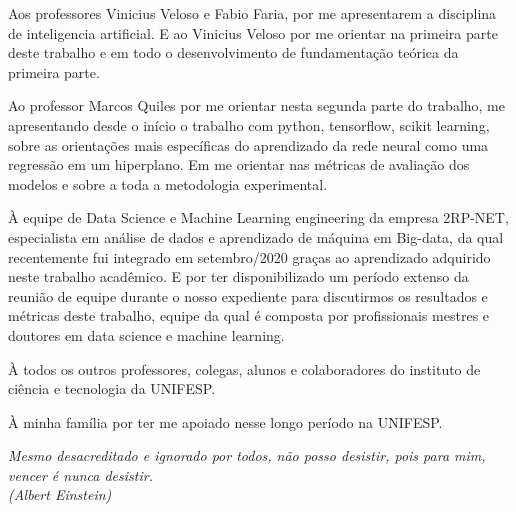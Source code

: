 \documentclass[	12pt, Times, openright, twoside, a4paper, english, brazil]{abntex2}
\begin{document}
\begin{agradecimentos}
                Aos professores Vinicius Veloso e Fabio Faria, por me apresentarem a disciplina de inteligencia artificial. E ao Vinicius Veloso por me orientar na primeira parte deste trabalho e em todo o desenvolvimento de fundamentação teórica da primeira parte.\newline
                
                Ao professor Marcos Quiles por me orientar nesta segunda parte do trabalho, me apresentando desde o início o trabalho com python, tensorflow, scikit learning, sobre as orientações mais específicas do aprendizado da rede neural como uma regressão em um hiperplano. Em me orientar nas métricas de avaliação dos modelos e sobre a toda a metodologia experimental.\newline
                
                À equipe de Data Science e Machine Learning engineering da empresa 2RP-NET, especialista em análise de dados e aprendizado de máquina em Big-data, da qual recentemente fui integrado em setembro/2020 graças ao aprendizado adquirido neste trabalho acadêmico. E por ter disponibilizado um período extenso da reunião de equipe durante o nosso expediente para discutirmos os resultados e métricas deste trabalho, equipe da qual é composta por profissionais mestres e doutores em data science e machine learning.\newline
                
                À todos os outros professores, colegas, alunos e colaboradores do instituto de ciência e tecnologia da UNIFESP.\newline
                
                À minha família por ter me apoiado nesse longo período na UNIFESP.\newline

    \end{agradecimentos}

    \begin{epigrafe}
        \vspace*{\fill}
    	\begin{flushright}
    		\textit{Mesmo desacreditado e ignorado por todos, não posso desistir, pois para mim, vencer é nunca desistir.\\
    		(Albert Einstein)}
    	\end{flushright}
    \end{epigrafe}

\end{document}
